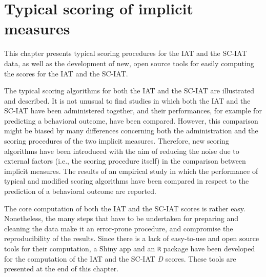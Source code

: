 \documentclass[12pt]{book}
\begin{document}
\chapter{Typical scoring of implicit measures}\label{chap:classicscore}
This chapter presents typical scoring procedures for the IAT and the SC-IAT data, as well as the development of new, open source tools for easily computing the scores for the IAT and the SC-IAT.

The typical scoring algorithms for both the IAT and the SC-IAT are illustrated and described. 
It is not unusual to find studies in which both the IAT and the SC-IAT have been administered together, and their performances, for example for predicting a behavioral outcome, have been compared. However, this comparison might be biased by many differences concerning both the administration and the scoring procedures of the two implicit measures. Therefore, new scoring algorithms have been introduced with the aim of reducing the noise due to external factors (i.e., the scoring procedure itself) in the comparison between implicit measures. 
The results of an empirical study in which the performance of typical and modified scoring algorithms have been compared in respect to the prediction of a behavioral outcome are reported.


The core computation of both the IAT and the SC-IAT scores is rather easy. Nonetheless, the many steps that have to be undertaken for preparing and cleaning the data make it an error-prone procedure, and compromise the reproducibility of the results. Since there is a lack of easy-to-use and open source tools for their computation, a Shiny app and an \verb*|R| package have been developed for the computation of the IAT and the SC-IAT \emph{D} scores. These tools are presented at the end of this chapter.
\end{document}
